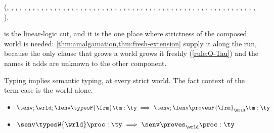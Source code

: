 (, , , ,
, , , ,
, , , ,
, , , ,
, , , ,
, , , ,
, , , ,
, , , ,
, , , ,
, , , ,
, , , ,
, , , ,
, , , ,
, , , ,
, , ).

 is the linear-logic cut, and it is the one place
where strictness of the composed world is needed:
\cref{thm:amalgamation,thm:fresh-extension} supply it along the run,
because the only clause that grows a world grows it freshly
(\ref{rule:Q-Tau}) and the names it adds are unknown to the other
component.

\begin{theorem}
\label{th:fundamental}
  Typing implies semantic typing, at every strict world. The fact context
  of the term case is the world alone.
  \begin{itemize}
    \item
      $
        \tenv ; \wrld ; \lenv \typesF{\frm} \tm : \ty
        \implies
        \tenv ; \lenv \provesF{\frm}_{\wrld} \tm : \ty
      $
    \item
      $
        \senv \typesW{\wrld} \proc : \ty
        \implies
        \senv \proves_{\wrld} \proc : \ty
      $
  \end{itemize}
\end{theorem}

